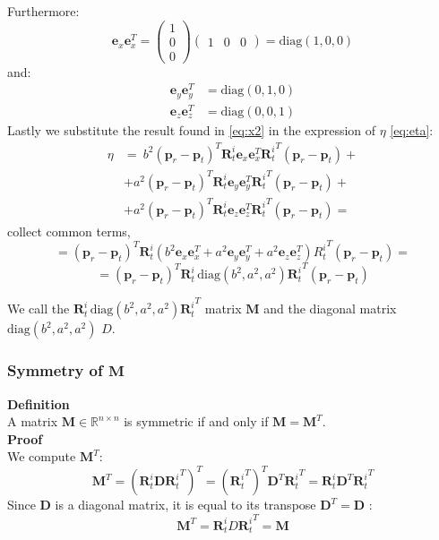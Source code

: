 Furthermore:
\[
\mathbf{e}_x \mathbf{e}_x^T =\begin{pmatrix}
1 \\
0 \\
0
\end{pmatrix}
\begin{pmatrix}
1 & 0 & 0
\end{pmatrix}
 = \text{diag}(1,0,0)
\]
and:
\[
\begin{aligned}
    \mathbf{e}_y \mathbf{e}_y^T &= \text{diag}(0,1,0) \\
    \mathbf{e}_z \mathbf{e}_z^T &= \text{diag}(0,0,1)
\end{aligned}
\]
Lastly we substitute the result found in \ref{eq:x2} in the expression of $\eta$ \ref{eq:eta}:
\[
\begin{aligned}
    \eta &=  \ b^2 \left(\mathbf{p}_r - \mathbf{p}_t\right)^T \mathbf{R}_t^i \mathbf{e}_x \mathbf{e}_x^T {\mathbf{R}_t^i}^T \left(\mathbf{p}_r - \mathbf{p}_t\right) + \\
    &+ a^2 \left(\mathbf{p}_r - \mathbf{p}_t\right)^T \mathbf{R}_t^i \mathbf{e}_y \mathbf{e}_y^T {\mathbf{R}_t^i}^T \left(\mathbf{p}_r - \mathbf{p}_t\right) +\\
    &+ a^2 \left(\mathbf{p}_r - \mathbf{p}_t\right)^T \mathbf{R}_t^i \mathbf{e}_z \mathbf{e}_z^T {\mathbf{R}_t^i}^T \left(\mathbf{p}_r - \mathbf{p}_t\right) =
\end{aligned}
\]
collect common terms,
\[
= \left(\mathbf{p}_r - \mathbf{p}_t\right)^T \mathbf{R}_t^i \left( b^2 \mathbf{e}_x \mathbf{e}_x^T + a^2 \mathbf{e}_y \mathbf{e}_y^T + a^2 \mathbf{e}_z \mathbf{e}_z^T \right) {R_t^i}^T \left(\mathbf{p}_r - \mathbf{p}_t\right)=
\]
\begin{equation}
    = \left(\mathbf{p}_r - \mathbf{p}_t\right)^T \mathbf{R}_t^i \, \text{diag}(b^2, a^2, a^2) {\mathbf{R}_t^i}^T \left(\mathbf{p}_r - \mathbf{p}_t\right)
    \label{eq:eta2}
\end{equation}

We call the \( \mathbf{R}_t^i \, \text{diag}(b^2, a^2, a^2) {\mathbf{R}_t^i}^T \) matrix $\mathbf{M}$ and the diagonal matrix $\text{diag}(b^2, a^2, a^2)$ $D$.

\subsubsection{Symmetry of \( \mathbf{M} \)}
\textbf{Definition} \\
A matrix \( \mathbf{M} \in \mathbb{R}^{n \times n} \) is symmetric if and only if \( \mathbf{M} = \mathbf{M}^T \).
\\
\textbf{Proof} \\
We compute \( \mathbf{M}^T \):
\[
    \mathbf{M}^T = \left( \mathbf{R}_t^i \mathbf{D} {\mathbf{R}_t^i}^T \right)^T = \left( {\mathbf{R}_t^i}^T \right)^T \mathbf{D}^T {\mathbf{R}_t^i}^T = \mathbf{R}_t^i \mathbf{D}^T {\mathbf{R}_t^i}^T
\]
Since \( \mathbf{D} \) is a diagonal matrix, it is equal to its transpose $\mathbf{D}^T = \mathbf{D}$ :
$$
\mathbf{M}^T =  \mathbf{R}_t^i D {\mathbf{R}_t^i}^T = \mathbf{M}
$$

